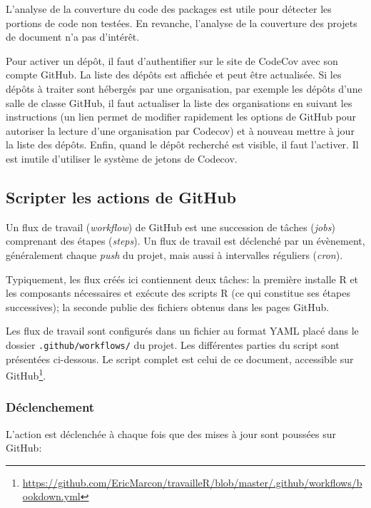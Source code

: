 \documentclass[
  12pt,
  french,
  a4paper,
  extrafontsizes,onecolumn,openright
  ]{memoir}
\begin{document}
L'analyse de la couverture du code des packages est utile pour détecter les portions de code non testées.
En revanche, l'analyse de la couverture des projets de document n'a pas d'intérêt.

Pour activer un dépôt, il faut d'authentifier sur le site de CodeCov avec son compte GitHub.
La liste des dépôts est affichée et peut être actualisée.
Si les dépôts à traiter sont hébergés par une organisation, par exemple les dépôts d'une salle de classe GitHub, il faut actualiser la liste des organisations en suivant les instructions (un lien permet de modifier rapidement les options de GitHub pour autoriser la lecture d'une organisation par Codecov) et à nouveau mettre à jour la liste des dépôts.
Enfin, quand le dépôt recherché est visible, il faut l'activer.
Il est inutile d'utiliser le système de jetons de Codecov.

\hypertarget{scripter-les-actions-de-github}{%
\subsection{Scripter les actions de GitHub}\label{scripter-les-actions-de-github}}

Un flux de travail (\emph{workflow}) de GitHub est une succession de tâches (\emph{jobs}) comprenant des étapes (\emph{steps}).
Un flux de travail est déclenché par un évènement, généralement chaque \emph{push} du projet, mais aussi à intervalles réguliers (\emph{cron}).

Typiquement, les flux créés ici contiennent deux tâches: la première installe R et les composants nécessaires et exécute des scripts R (ce qui constitue ses étapes successives); la seconde publie des fichiers obtenus dans les pages GitHub.

Les flux de travail sont configurés dans un fichier au format YAML placé dans le dossier \texttt{.github/workflows/} du projet.
Les différentes parties du script sont présentées ci-dessous.
Le script complet est celui de ce document, accessible sur GitHub\footnote{\url{https://github.com/EricMarcon/travailleR/blob/master/.github/workflows/bookdown.yml}}.

\hypertarget{sec:declenchement}{%
\subsubsection{Déclenchement}\label{sec:declenchement}}

L'action est déclenchée à chaque fois que des mises à jour sont poussées sur GitHub:
\end{document}
